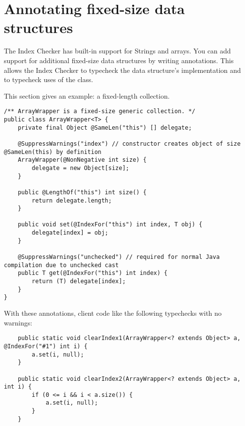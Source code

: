 \section{Annotating fixed-size data structures\label{index-annotating-fixed-size}}

The Index Checker has built-in support for Strings and arrays.
You can add support for additional fixed-size data structures by writing
annotations.
This allows the Index Checker to typecheck the data structure's
implementation and to typecheck uses of the class.

This section gives an example:  a fixed-length collection.

\begin{Verbatim}
/** ArrayWrapper is a fixed-size generic collection. */
public class ArrayWrapper<T> {
    private final Object @SameLen("this") [] delegate;

    @SuppressWarnings("index") // constructor creates object of size @SameLen(this) by definition
    ArrayWrapper(@NonNegative int size) {
        delegate = new Object[size];
    }

    public @LengthOf("this") int size() {
        return delegate.length;
    }

    public void set(@IndexFor("this") int index, T obj) {
        delegate[index] = obj;
    }

    @SuppressWarnings("unchecked") // required for normal Java compilation due to unchecked cast
    public T get(@IndexFor("this") int index) {
        return (T) delegate[index];
    }
}
\end{Verbatim}

With these annotations, client code like the following typechecks with no
warnings:
\begin{Verbatim}
    public static void clearIndex1(ArrayWrapper<? extends Object> a, @IndexFor("#1") int i) {
        a.set(i, null);
    }

    public static void clearIndex2(ArrayWrapper<? extends Object> a, int i) {
        if (0 <= i && i < a.size()) {
            a.set(i, null);
        }
    }
\end{Verbatim}

